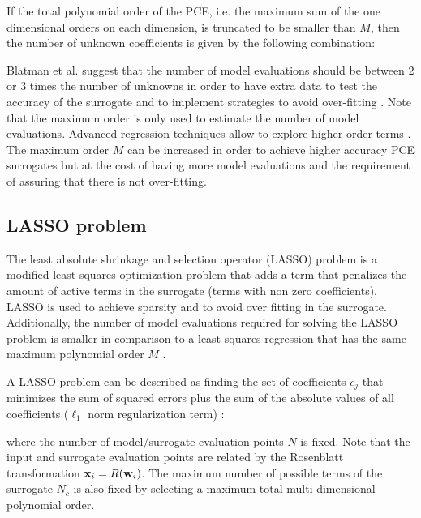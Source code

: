 \documentclass[preprint,12pt]{elsarticle}
\begin{document}
If the total polynomial order of the PCE, i.e. the maximum sum of the one dimensional orders on each dimension, is truncated to be smaller than $M$, then the number of unknown coefficients is given by the following combination:


Blatman et al. suggest that the number of model evaluations should be between 2 or 3 times the number of unknowns in order to have extra data to test the accuracy of the surrogate and to implement strategies to avoid over-fitting \cite{blatman2011adaptive}. Note that the maximum order is only used to estimate the number of model evaluations. Advanced regression techniques allow to explore higher order terms \cite{tibshirani1996regression, blatman2011adaptive}. The maximum order $M$ can be increased in order to achieve higher accuracy PCE surrogates but at the cost of having more model evaluations and the requirement of assuring that there is not over-fitting.

\subsection{LASSO problem}
\label{sec_LASSO}

The least absolute shrinkage and selection operator (LASSO) problem is a modified least squares optimization problem that adds a term that penalizes the amount of active terms in the surrogate (terms with non zero coefficients). LASSO is used to achieve sparsity and to avoid over fitting in the surrogate. Additionally, the number of model evaluations required for solving the LASSO problem is smaller in comparison to a least squares regression that has the same maximum polynomial order $M$ \cite{blatman2011adaptive}.

A LASSO problem can be described as finding the set of coefficients $c_j$ that minimizes the sum of squared errors plus the sum of the absolute values of all coefficients ($\ell_1$ norm regularization term) \cite{tibshirani1996regression}:



\noindent where the number of model/surrogate evaluation points $N$ is fixed. Note that the input and surrogate evaluation points are related by the Rosenblatt transformation $\mathbf{x}_i=R(\mathbf{w}_i)$. The maximum number of possible terms of the surrogate $N_c$ is also fixed by selecting a maximum total multi-dimensional polynomial order.
\end{document}
